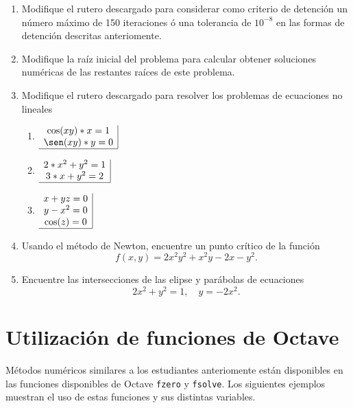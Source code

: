 \documentclass[letter,11pt]{article}
\newcommand\0{\mathbf{0}}
\newcommand{\octave}{{\sc Octave} }
\begin{document}
    \begin{enumerate}
    \item Modifique el rutero descargado para considerar como criterio de detenci\'on un n\'umero m\'aximo de 150 iteraciones \'o una tolerancia de $10^{-8}$ en las formas de detenci\'on descritas anteriomente.
    \item Modifique la ra\'iz inicial del problema para calcular obtener soluciones num\'ericas de las restantes ra\'ices de este problema.
    \item Modifique el rutero descargado para resolver los problemas de ecuaciones no lineales
    \begin{multicols}{3}
    \begin{enumerate}
    \item $\begin{array}{c|}
		   \cos(xy)*x=1\\
           \sen(xy)*y=0\\
           \hline
           \end{array}$
           
      \item $\begin{array}{c|}
		   2*x^2+y^2=1\\
           3*x+y^2=2\\
           \hline
           \end{array}$
           
       \item $\begin{array}{c|}
		   x+yz=0\\
           y-x^2=0\\
           \cos(z)=0\\
           \hline
           \end{array}$
    \end{enumerate}
    \end{multicols}
    
    \item Usando el m\'etodo de Newton, encuentre un punto cr\'itico de la funci\'on
    $$
    f(x,y)=2x^2y^2+x^2y-2x-y^2.
    $$
    
    \item Encuentre las intersecciones de las elipse y par\'abolas de ecuaciones
    $$
    2x^2+y^2=1 , \quad y=-2x^2.
    $$
    \end{enumerate}
    

\newpage
\section{Utilizaci\'on de funciones  de \octave}
M\'etodos num\'ericos similares a los estudiantes anteriomente est\'an disponibles en las funciones disponibles de \octave \texttt{fzero} y \texttt{fsolve}. Los siguientes ejemplos muestran el uso de estas funciones y sus distintas variables.
\end{document}
